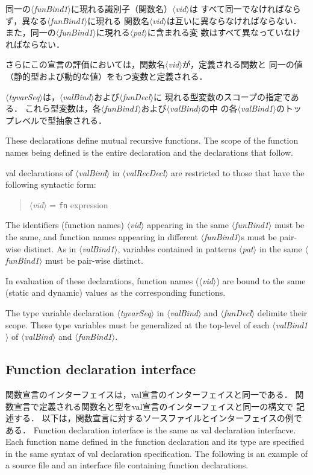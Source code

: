 \documentclass{jbook}
\newcommand{\txt}[2]{#2}
\newcommand{\nonterm}[1]{\mbox{$\langle$}{\it #1}\mbox{$\rangle$}}
\newcommand{\term}[1]{\mbox{{\tt #1}}}
\newenvironment{program}{\begin{quote}\begin{tt}}%
                        {\end{tt}\end{quote}}
\begin{document}
	同一の\nonterm{funBind1}に現れる識別子（関数名）\nonterm{vid}は
すべて同一でなければならず，異なる\nonterm{funBind1}に現れる
関数名\nonterm{vid}は互いに異ならなければならない．
	また，同一の\nonterm{funBind1}に現れる\nonterm{pat}に含まれる変
数はすべて異なっていなければならない．

	さらにこの宣言の評価においては，関数名\nonterm{vid}が，定義される関数と
同一の値（静的型および動的な値）をもつ変数と定義される．

	\nonterm{tyvarSeq}は，\nonterm{valBind}および\nonterm{funDecl}に
現れる型変数のスコープの指定である．
	これら型変数は，各\nonterm{funBind1}および\nonterm{valBind}の中
の各\nonterm{valBind1}のトップレベルで型抽象される．

\else%
	These declarations define mutual recursive functions.
	The scope of the function names being defined is the entire
declaration and the declarations that follow.

	val declarations of \nonterm{valBind} in \nonterm{valRecDecl}
are restricted to those that have the following syntactic form:
\begin{program}
\nonterm{vid} = \term{fn} {\rm expression}
\end{program}

	The identifiers (function names) \nonterm{vid} appearing in the
same \nonterm{funBind1} must be the same, and function names appearing
in different \nonterm{funBind1}s must be pair-wise distinct.
	As in \nonterm{valBind1}, variables contained in patterns
\nonterm{pat} in the same \nonterm{funBind1} must be pair-wise distinct.

	In evaluation of these declarations, function names (\nonterm{vid})
are bound to the same (static and dynamic) values as the corresponding
functions.

	The type variable declaration \nonterm{tyvarSeq} in
\nonterm{valBind} and \nonterm{funDecl} delimite their scope.
	These type variables must be generalized at the top-level of
each \nonterm{valBind1} of \nonterm{valBind} and  \nonterm{funBind1}.
\fi%


\subsection{\txt{関数宣言インターフェイス}{Function declaration interface}}
\ifjp%
	関数宣言のインターフェイスは，val宣言のインターフェイスと同一である．
	関数宣言で定義される関数名と型をval宣言のインターフェイスと同一の構文で
記述する．
	以下は，関数宣言に対するソースファイルとインターフェイスの例である．
\else%
	Function declaration interface is the same as val declaration
interfacve. 
	Each function name defined in the function declaration and its
type are specified in the same syntax of val declaration specification.
	The following is an example of a source file and an interface
file containing function declarations.
\fi%
\end{document}
